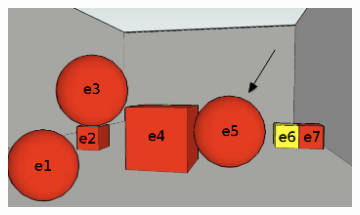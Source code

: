 \begin{figure}[!ht]
\begin{subfigure}{.5\textwidth}

\centering
\includegraphics[width=\textwidth]{images/22paraRelacionalLetras.png}\\[0pt]
\end{subfigure}
\hspace*{0cm}
\begin{subfigure}{.5\textwidth}


\end{subfigure}
\end{figure}
